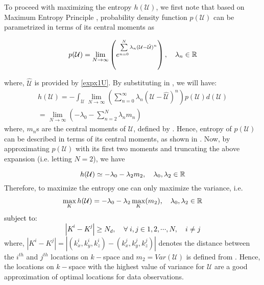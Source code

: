\documentclass{article}         %
\theoremstyle{definition}
\theoremstyle{remark}
\begin{document}
To proceed with maximizing the entropy $h(\mathcal{U})$, we first note that based on Maximum Entropy Principle \cite{cover2012elements}, probability density function $p(\mathcal{U})$ can be parametrized in terms of its central moments as

\begin{equation}\label{pu_entropy}
p(\mathcal{U})=\lim_{N\rightarrow \infty} \left(e^{\sum\limits_{n=0}^N \lambda_n (\mathcal{U}-\hat{\mathcal{U}})^n}\right),\quad \lambda_n \in \mathbb R
\end{equation}

where, $\hat{\mathcal{U}}$ is provided by \eqref{expx1U}. By substituting  in , we will have:
$  $
\begin{align}
h(\mathcal{U})=-\int_{\mathcal{U}} \lim_{N\rightarrow \infty} \left(\sum\limits_{n=0}^\infty \lambda_n (\mathcal{U}-\hat{\mathcal{U}})^n\right) p(\mathcal{U})d(\mathcal{U})\nonumber\\
= \lim_{N \rightarrow \infty} (-\lambda_0 - \sum\limits_{n=2}^{N} \lambda_n m_n) \label{entropy_moments}
\end{align}
where, $m_n$s are the central moments of $\mathcal{U}$, defined by . Hence, entropy of $p(\mathcal{U})$ can be described in terms of its central moments, as shown in . Now, by approximating $p(\mathcal{U})$ with its first two moments and truncating the above expansion (i.e. letting $N=2$), we have 

\begin{equation}\label{entropy_var}
h(\mathcal{U})\simeq -\lambda_0-\lambda_2 m_2,\quad \lambda_0,\lambda_2 \in \mathbb R
\end{equation}
Therefore, to maximize the entropy one can only maximize the variance, i.e.
\begin{eqnarray}\label{entropy_var_max}
\max_{K} h(\mathcal{U})= -\lambda_0 -\lambda_2 \max_{K}(m_2), \quad \lambda_0,\lambda_2 \in \mathbb R
\end{eqnarray}
\textcolor{black}{subject to:
\begin{equation}\label{sparsity_con}
|K^i-K^j|\geq N_d,\quad \forall\ i,j\in 1,2,\cdots,N,\quad i\neq j 
\end{equation}}
where, $|K^i-K^j|=|(k_x^i,k_y^i,k_z^i)-(k_x^j,k_y^j,k_z^j)|$ denotes the distance between the $i^{th}$ and $j^{th}$ locations on $k-$space and $m_2=Var(\mathcal{U})$ is defined from . Hence, the locations on $k-$space with the highest value of variance for $\mathcal{U}$ are a good approximation of optimal locations for data observations. 
\end{document}
